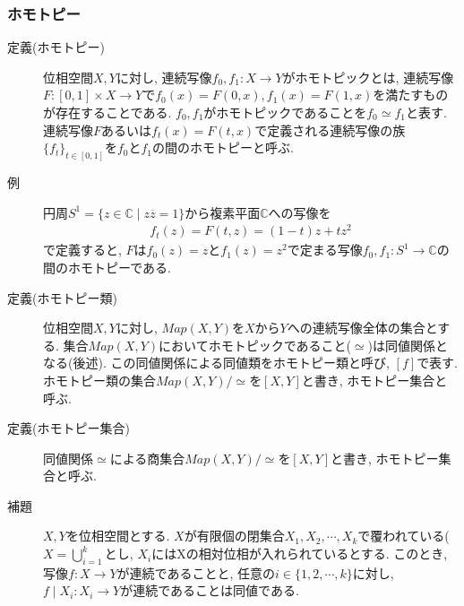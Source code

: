 \documentclass[i]{jsarticle}
\begin{document}
\subsubsection{ホモトピー}
\begin{description}
  \item[定義(ホモトピー)] 位相空間$X, Y$に対し, 連続写像$f_{0}, f_{1}:X \to Y$がホモトピックとは, 連続写像$F: [0,1]\times X\to Y$で$f_{0}(x)=F(0,x),f_{1}(x)=F(1,x)$を満たすものが存在することである.
$f_{0}, f_{1}$がホモトピックであることを$f_{0}\simeq f_{1}$と表す.
連続写像$F$あるいは$f_{t}(x)=F(t, x)$で定義される連続写像の族$\{f_{t}\}_{t\in [0,1]}$を$f_{0}$と$f_{1}$の間のホモトピーと呼ぶ.
\end{description}
\begin{description}
  \item[例] 円周$S^{1}=\{z\in \mathbb{C} \mid z\overline{z}=1 \}$から複素平面$\mathbb{C}$への写像を
\begin{align*}
  f_{t}(z)=F(t, z)=(1-t)z+tz^2
\end{align*}
で定義すると, $F$は$f_{0}(z)=z$と$f_{1}(z)=z^2$で定まる写像$f_{0}, f_{1}:S^{1}\to \mathbb{C}$の間のホモトピーである.
\end{description}
\begin{description}
  \item[定義(ホモトピー類)] 位相空間$X, Y$に対し, $Map(X,Y)$を$X$から$Y$への連続写像全体の集合とする.
集合$Map(X, Y)$においてホモトピックであること($\simeq$)は同値関係となる(後述). この同値関係による同値類をホモトピー類と呼び, $[f]$で表す.
ホモトピー類の集合$Map(X, Y)/\simeq$を$[X, Y]$と書き, ホモトピー集合と呼ぶ.
\end{description}
\begin{description}
  \item[定義(ホモトピー集合)] 同値関係$\simeq$による商集合$Map(X, Y)/\simeq$を$[X, Y]$と書き, ホモトピー集合と呼ぶ.
\end{description}
\begin{description}
  \item[補題] $X,Y$を位相空間とする. $X$が有限個の閉集合$X_{1},X_{2},\cdots, X_{k}$で覆われている($X=\bigcup_{i=1}^{k}$とし, $X_{i}$にはXの相対位相が入れられているとする.
このとき, 写像$f: X\to Y$が連続であることと, 任意の$i\in \{1,2, \cdots, k\}$に対し, $f\mid X_{i}:X_{i}\to Y$が連続であることは同値である.
\end{description}
\end{document}
